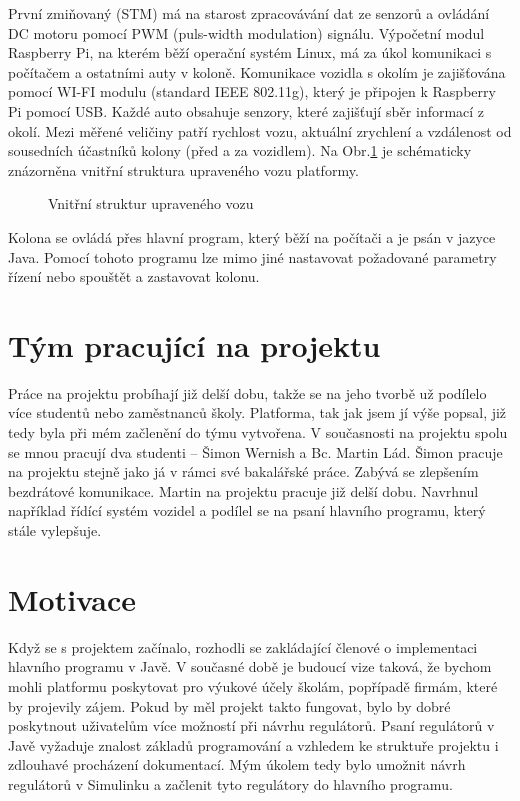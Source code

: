 \documentclass[thesis=M,czech,hidelinks]{FITthesis}[2012/06/26]
\begin{document}
První zmiňovaný (STM) má na starost zpracovávání dat ze senzorů a ovládání DC motoru pomocí PWM (puls-width modulation) signálu. Výpočetní modul Raspberry Pi, na kterém běží operační systém Linux, má za úkol komunikaci s počítačem a ostatními auty v koloně. Komunikace vozidla s okolím je zajišťována pomocí WI-FI  modulu (standard IEEE 802.11g), který je připojen k Raspberry Pi pomocí USB. Každé auto obsahuje senzory, které zajišťují sběr informací z okolí. Mezi měřené veličiny patří rychlost vozu, aktuální zrychlení a vzdálenost od sousedních účastníků kolony (před a za vozidlem). Na Obr.\ref{fig:ee} je schématicky znázorněna vnitřní struktura upraveného vozu platformy. 
\begin{figure}[h]
        \centering
        \caption{Vnitřní struktur upraveného vozu\cite{slotcar}}
        \label{fig:ee}
\end{figure}

Kolona se ovládá přes hlavní program, který běží na počítači a je psán v jazyce Java. Pomocí tohoto programu lze mimo jiné nastavovat požadované parametry řízení nebo spouštět a zastavovat kolonu. \cite{slotcar}\cite{jan}\cite{martin}

 
\section{Tým pracující na projektu}
Práce na projektu probíhají již delší dobu, takže se na jeho tvorbě už podílelo více studentů nebo zaměstnanců školy. Platforma, tak jak jsem jí výše popsal, již tedy byla při mém začlenění do týmu vytvořena. V současnosti na projektu spolu se mnou pracují dva studenti – Šimon Wernish a Bc. Martin Lád. Šimon pracuje na projektu stejně jako já v rámci své bakalářské práce. Zabývá se zlepšením bezdrátové komunikace. Martin na projektu pracuje již delší dobu. Navrhnul například řídící systém vozidel a podílel se na psaní hlavního programu, který stále vylepšuje. 
  
\section{Motivace}
Když se s projektem začínalo, rozhodli se zakládající členové o implementaci hlavního programu v Javě. V současné době je budoucí vize taková, že bychom mohli platformu poskytovat pro výukové účely školám, popřípadě firmám, které by projevily zájem. Pokud by měl projekt takto fungovat, bylo by dobré poskytnout uživatelům více možností při návrhu regulátorů. Psaní regulátorů v Javě vyžaduje znalost základů programování a vzhledem ke struktuře projektu i zdlouhavé procházení dokumentací. Mým úkolem tedy bylo umožnit návrh regulátorů v Simulinku a začlenit tyto regulátory do hlavního programu. 
  
\end{document}
